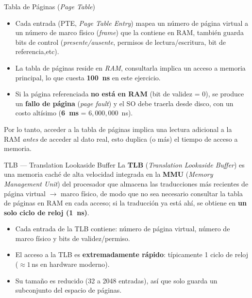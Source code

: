 \documentclass[12pt,letterpaper]{article}
\begin{document}
\begin{conceptbox}{Tabla de Páginas (\textit{Page Table})}
  \begin{itemize}
  \item Cada entrada (PTE, \textit{Page Table Entry}) mapea un número de página virtual
    a un número de marco físico (\emph{frame}) que la contiene en RAM, también guarda bits de control (\textit{presente/ausente}, permisos de lectura/escritura, bit de referencia,etc).
  \item La tabla de páginas reside en \emph{RAM}, consultarla implica un acceso a memoria principal, lo que cuesta \textbf{100~ns} en este ejercicio.
  \item Si la página referenciada \textbf{no está en RAM} (bit de validez = 0), se produce un \textbf{fallo de página} (\emph{page fault}) y el SO debe traerla desde disco, con un costo altísimo (\textbf{6~ms} = $6{,}000{,}000$~ns).
  \end{itemize}

  Por lo tanto, acceder a la tabla de páginas implica una lectura adicional a la RAM \emph{antes} de acceder al dato real, esto duplica (o más) el tiempo de acceso a memoria.
\end{conceptbox}

\bigskip

\begin{conceptbox}{TLB — Translation Lookaside Buffer}
La \textbf{TLB} (\textit{Translation Lookaside Buffer}) es una memoria caché de alta velocidad integrada en la \textbf{MMU} (\textit{Memory Management Unit}) del procesador que almacena las traducciones más recientes de página virtual $\to$ marco físico, de modo que no sea necesario consultar la tabla de páginas en RAM en cada acceso; si la traducción ya está ahí, se obtiene en \textbf{un solo ciclo de reloj (1~ns)}.

\begin{itemize}
  \item Cada entrada de la TLB contiene: número de página virtual,
        número de marco físico y bits de validez/permiso.
  \item El acceso a la TLB es \textbf{extremadamente rápido}: típicamente
        1 ciclo de reloj ($\approx 1$\,ns en hardware moderno).
  \item Su tamaño es reducido (32 a 2048 entradas), así que solo guarda un
        subconjunto del espacio de páginas.
\end{itemize}
\end{conceptbox}
\end{document}
